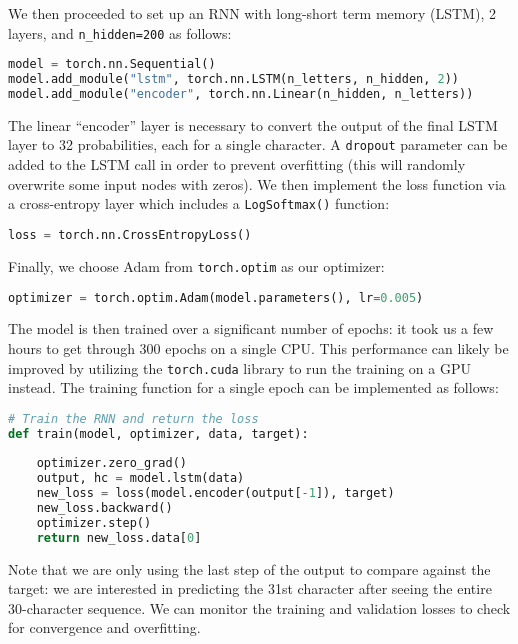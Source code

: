 \documentclass{article}
\begin{document}
\begin{remark}
We then proceeded to set up an RNN with long-short term memory (LSTM), 2 layers, and \verb|n_hidden=200| as follows:
\begin{lstlisting}[language=Python]
model = torch.nn.Sequential()
model.add_module("lstm", torch.nn.LSTM(n_letters, n_hidden, 2))
model.add_module("encoder", torch.nn.Linear(n_hidden, n_letters))
\end{lstlisting}
The linear ``encoder'' layer is necessary to convert the output of the final LSTM layer to 32 probabilities, each for a single character. A \verb|dropout| parameter can be added to the LSTM call in order to prevent overfitting (this will randomly overwrite some input nodes with zeros). We then implement the loss function via a cross-entropy layer which includes a \verb|LogSoftmax()| function:
\begin{lstlisting}[language=Python]
loss = torch.nn.CrossEntropyLoss()
\end{lstlisting}
Finally, we choose Adam from \verb|torch.optim| as our optimizer:
\begin{lstlisting}[language=Python]
optimizer = torch.optim.Adam(model.parameters(), lr=0.005)
\end{lstlisting}

The model is then trained over a significant number of epochs: it took us a few hours to get through 300 epochs on a single CPU. This performance can likely be improved by utilizing the \verb|torch.cuda| library to run the training on a GPU instead. The training function for a single epoch can be implemented as follows:
\begin{lstlisting}[language=Python]
# Train the RNN and return the loss
def train(model, optimizer, data, target):
    
    optimizer.zero_grad()
    output, hc = model.lstm(data)
    new_loss = loss(model.encoder(output[-1]), target)
    new_loss.backward()
    optimizer.step()
    return new_loss.data[0]
\end{lstlisting}
Note that we are only using the last step of the output to compare against the target: we are interested in predicting the 31st character after seeing the entire 30-character sequence. We can monitor the training and validation losses to check for convergence and overfitting.


\end{remark}
\end{document}
